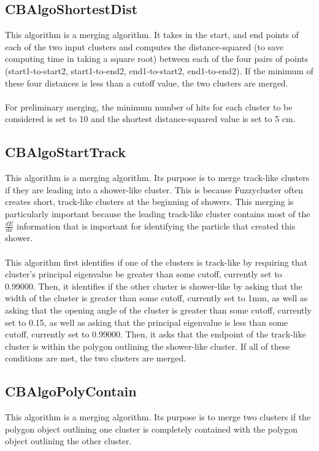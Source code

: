 \documentclass{article}
\begin{document}
    
\subsection{CBAlgoShortestDist}\label{sec:CBAlgoShortestDist}
This algorithm is a merging algorithm. It takes in the start, and end points of each of the two input clusters and 
computes the distance-squared (to save computing time in taking a square root) between each of the four pairs of points 
(start1-to-start2, start1-to-end2, end1-to-start2, end1-to-end2). If the minimum of these four distances is less than
a cutoff value, the two clusters are merged.\\\\
For preliminary merging, the minimum number of hits for each cluster to be considered is set to 10 and the shortest 
distance-squared value is set to 5 cm.

\subsection{CBAlgoStartTrack}\label{sec:CBAlgoStartTrack}
This algorithm is a merging algorithm. Its purpose is to merge track-like clusters if they are leading into a shower-like
cluster. This is because Fuzzycluster often creates short, track-like clusters at the beginning of showers. This merging 
is particularly important because the leading track-like cluster contains most of the $\frac{dE}{dx}$ information that is
important for identifying the particle that created this shower.\\\\
This algorithm first identifies if one of the clusters is track-like by requiring that cluster's principal eigenvalue be
greater than some cutoff, currently set to 0.99000. Then, it identifies if the other cluster is shower-like by asking that 
the width of the cluster is greater than some cutoff, currently set to 1mm, as well as asking that the opening angle of 
the cluster is greater than some cutoff, currently set to 0.15, as well as asking that the principal eigenvalue is less 
than some cutoff, currently set to 0.99000. Then, it asks that the endpoint of the track-like cluster is within the polygon
outlining the shower-like cluster. If all of these conditions are met, the two clusters are merged.

\subsection{CBAlgoPolyContain}\label{sec:CBAlgoPolyContain}
This algorithm is a merging algorithm. Its purpose is to merge two clusters if the polygon object outlining one cluster
is completely contained with the polygon object outlining the other cluster.
\end{document}

